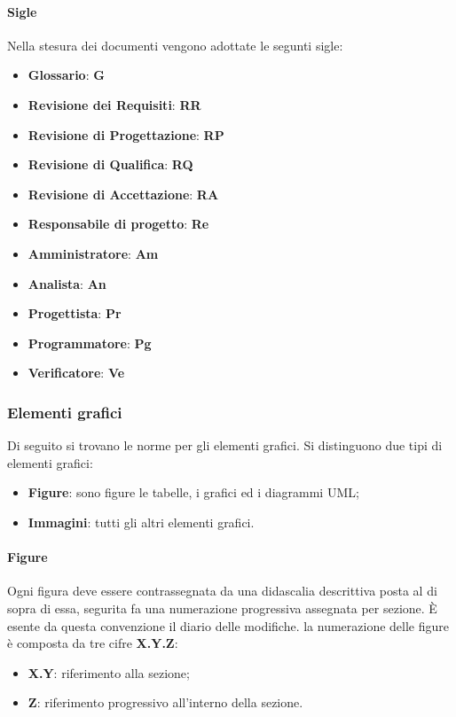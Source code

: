 	    \paragraph{Sigle}
	    Nella stesura dei documenti vengono adottate le segunti sigle:
	    \begin{itemize}
	        \item \textbf{Glossario}: \textbf{G}
	        \item \textbf{Revisione dei Requisiti}: \textbf{RR}
	        \item \textbf{Revisione di Progettazione}: \textbf{RP}
	        \item \textbf{Revisione di Qualifica}: \textbf{RQ}
	        \item \textbf{Revisione di Accettazione}: \textbf{RA}
	        \item \textbf{Responsabile di progetto}: \textbf{Re}
	        \item \textbf{Amministratore}: \textbf{Am}
	        \item \textbf{Analista}: \textbf{An}
	        \item \textbf{Progettista}: \textbf{Pr}
	        \item \textbf{Programmatore}: \textbf{Pg}
	        \item \textbf{Verificatore}: \textbf{Ve}
	    \end{itemize}
	    \subsubsection{Elementi grafici}
	    Di seguito si trovano le norme per gli elementi grafici. Si distinguono due tipi di elementi grafici:
	    \begin{itemize}
	        \item \textbf{Figure}: sono figure le tabelle, i grafici ed i diagrammi UML;
	        \item \textbf{Immagini}: tutti gli altri elementi grafici. 
	    \end{itemize}
	    \paragraph{Figure}
	    Ogni figura deve essere contrassegnata da una didascalia descrittiva posta al di sopra di essa, segurita fa una numerazione progressiva assegnata per sezione. È esente da questa convenzione il diario delle modifiche.
	    la numerazione delle figure è composta da tre cifre \textbf{X.Y.Z}:
	    \begin{itemize}
	        \item \textbf{X.Y}: riferimento alla sezione;
	        \item \textbf{Z}: riferimento progressivo all'interno della sezione.
	    \end{itemize}
